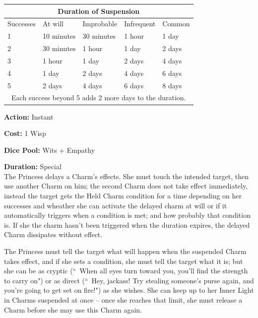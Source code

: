  \centering 
    \begin{tabular}{|l|l|l|l|l|}
        \hline
        \multicolumn{5}{|c|}{Duration of Suspension}                                         \\ \hline
        Successes                                                & At will    & Improbable & Infrequent & Common  \\ \hline
        1                                                        & 10 minutes & 30 minutes & 1 hour     & 1 day   \\ \hline
        2                                                        & 30 minutes & 1 hour     & 1 day      & 2 days  \\ \hline
        3                                                        & 1 hour     & 1 day      & 2 days     & 4 days  \\ \hline
        4                                                        & 1 day      & 2 days     & 4 days     & 6 days  \\ \hline
        5                                                        & 2 days     & 4 days     & 6 days     & 8 days  \\ \hline
        \multicolumn{5}{|c|}{Each success beyond 5 adds 2 more days to the duration.}        \\
        \hline
    \end{tabular}
    \bigsidebarend


\noindent \textbf{Action:} Instant

\noindent \textbf{Cost:} 1 Wisp

\noindent \textbf{Dice Pool:} Wits + Empathy

\noindent \textbf{Duration:} Special \\

\noindent The Princess delays a Charm's effects. She must touch the intended target, then use another Charm on him; the second Charm does not take effect immediately, instead the target gets the Held Charm condition for a time depending on her successes and wheather she can activate the delayed charm at will or if it automatically triggers when a condition is met; and how probably that condition is. If she the charm hasn't been triggered when the duration  expires, the delayed Charm dissipates without effect. 

The Princess must tell the target what will happen when the suspended Charm takes effect, and if she sets a condition, she must tell the target what it is; but she can be as cryptic (\textquotedblleft\, When all eyes turn toward you, you'll find the strength to carry on") or as direct (\textquotedblleft\, Hey, jackass! Try stealing someone's purse again, and you're going to get set on fire!") as she wishes. She can keep up to her Inner Light in Charms suspended at once -- once she reaches that limit, she must release a Charm before she may use this Charm again.

